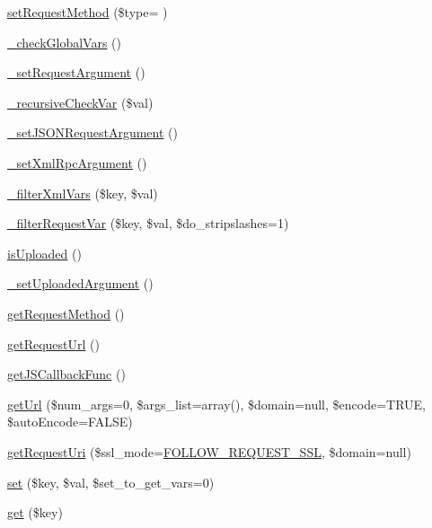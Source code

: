 \begin{DoxyCompactItemize}
\item 
\hyperlink{classContext_aa47d184757d451009f0597153d323ccc}{set\+Request\+Method} (\$type= \textquotesingle{}\textquotesingle{})
\item 
\hyperlink{classContext_a8030f7c76467bfcec812be76f55571cd}{\+\_\+check\+Global\+Vars} ()
\item 
\hyperlink{classContext_acfc274753d9687732458bfaba540c120}{\+\_\+set\+Request\+Argument} ()
\item 
\hyperlink{classContext_aae89f13e0d99577a6cb8a3bac584cee1}{\+\_\+recursive\+Check\+Var} (\$val)
\item 
\hyperlink{classContext_ae07924273ca1b17fe67a7cf978d762fc}{\+\_\+set\+J\+S\+O\+N\+Request\+Argument} ()
\item 
\hyperlink{classContext_abaa9eeef192a9e4b48a06d0af9b1fd05}{\+\_\+set\+Xml\+Rpc\+Argument} ()
\item 
\hyperlink{classContext_a8104d3bb19322baf793f4a3cc0aad078}{\+\_\+filter\+Xml\+Vars} (\$key, \$val)
\item 
\hyperlink{classContext_a3c411bc0bf786b605af4a7af8ad3ee53}{\+\_\+filter\+Request\+Var} (\$key, \$val, \$do\+\_\+stripslashes=1)
\item 
\hyperlink{classContext_a65ee4d61d0211c8a3f0eeb4251c85892}{is\+Uploaded} ()
\item 
\hyperlink{classContext_a9c821f96670ef47c7139bafc6b39091b}{\+\_\+set\+Uploaded\+Argument} ()
\item 
\hyperlink{classContext_a6912ff86e08ef782a296b77ff1307481}{get\+Request\+Method} ()
\item 
\hyperlink{classContext_ace7f220a4d945de0172f0c1fc98fe31e}{get\+Request\+Url} ()
\item 
\hyperlink{classContext_ab2e157a87d2b960d78b2c3f35ae7da23}{get\+J\+S\+Callback\+Func} ()
\item 
\hyperlink{classContext_aa60b75d32d4923bb3b9854985a82ce36}{get\+Url} (\$num\+\_\+args=0, \$args\+\_\+list=array(), \$domain=null, \$encode=T\+R\+U\+E, \$auto\+Encode=F\+A\+L\+S\+E)
\item 
\hyperlink{classContext_aa79578cfccee4d7f7c4890dc6e36ff90}{get\+Request\+Uri} (\$ssl\+\_\+mode=\hyperlink{Context_8class_8php_a546ef85538017b41b2928e818066989d}{F\+O\+L\+L\+O\+W\+\_\+\+R\+E\+Q\+U\+E\+S\+T\+\_\+\+S\+S\+L}, \$domain=null)
\item 
\hyperlink{classContext_a9f79aa7aecf2e4d8006e517844523fc2}{set} (\$key, \$val, \$set\+\_\+to\+\_\+get\+\_\+vars=0)
\item 
\hyperlink{classContext_a90ce25d65fe6c9778421cbb36ab3def5}{get} (\$key)

\end{DoxyCompactItemize}

